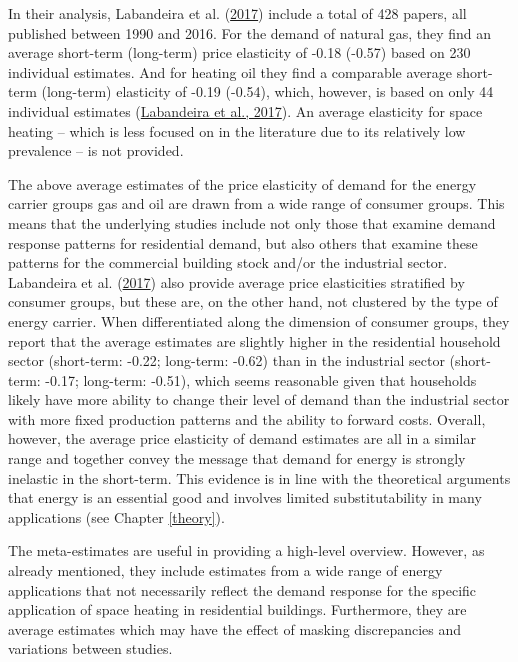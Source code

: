 \documentclass[12pt,twoside]{reedthesis}
\begin{document}
In their analysis, Labandeira et al. (\protect\hyperlink{ref-labandeira_etal17}{2017}) include a total of 428 papers, all published between 1990 and 2016. For the demand of natural gas, they find an average short-term (long-term) price elasticity of -0.18 (-0.57) based on 230 individual estimates. And for heating oil they find a comparable average short-term (long-term) elasticity of -0.19 (-0.54), which, however, is based on only 44 individual estimates (\protect\hyperlink{ref-labandeira_etal17}{Labandeira et al., 2017}). An average elasticity for space heating -- which is less focused on in the literature due to its relatively low prevalence -- is not provided.

The above average estimates of the price elasticity of demand for the energy carrier groups gas and oil are drawn from a wide range of consumer groups. This means that the underlying studies include not only those that examine demand response patterns for residential demand, but also others that examine these patterns for the commercial building stock and/or the industrial sector. Labandeira et al. (\protect\hyperlink{ref-labandeira_etal17}{2017}) also provide average price elasticities stratified by consumer groups, but these are, on the other hand, not clustered by the type of energy carrier. When differentiated along the dimension of consumer groups, they report that the average estimates are slightly higher in the residential household sector (short-term: -0.22; long-term: -0.62) than in the industrial sector (short-term: -0.17; long-term: -0.51), which seems reasonable given that households likely have more ability to change their level of demand than the industrial sector with more fixed production patterns and the ability to forward costs. Overall, however, the average price elasticity of demand estimates are all in a similar range and together convey the message that demand for energy is strongly inelastic in the short-term. This evidence is in line with the theoretical arguments that energy is an essential good and involves limited substitutability in many applications (see Chapter \ref{theory}).

The meta-estimates are useful in providing a high-level overview. However, as already mentioned, they include estimates from a wide range of energy applications that not necessarily reflect the demand response for the specific application of space heating in residential buildings. Furthermore, they are average estimates which may have the effect of masking discrepancies and variations between studies.
\end{document}
